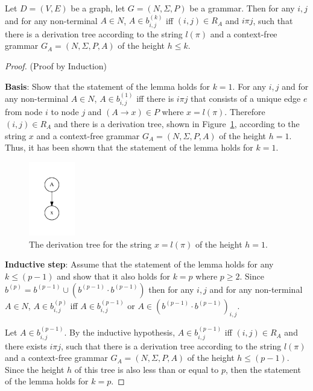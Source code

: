 \begin{lemma}
Let $D = (V,E)$ be a graph, let $G =(N,\Sigma,P)$ be a grammar. Then for any $i, j$ and for any non-terminal $A \in N$, $A \in b^{(k)}_{i,j}$ iff $(i,j) \in R_A$ and $i \pi j$, such that there is a derivation tree according to the string $l(\pi)$ and a context-free grammar $G_A = (N,\Sigma,P,A)$ of the height $h \leq k$.
\end{lemma}
\begin{proof}(Proof by Induction)

\textbf{Basis}: Show that the statement of the lemma holds for $k = 1$. For any $i, j$ and for any non-terminal $A \in N$, $A \in b^{(1)}_{i,j}$ iff there is $i \pi j$ that consists of a unique edge $e$ from node $i$ to node $j$ and $(A \rightarrow x) \in P$ where $x = l(\pi)$. Therefore $(i,j) \in R_A$ and there is a derivation tree, shown in Figure~\ref{tree1}, according to the string $x$ and a context-free grammar $G_A = (N,\Sigma,P,A)$ of the height $h = 1$. Thus, it has been shown that the statement of the lemma holds for $k = 1$.

\begin{figure}[h!]
 \centering
 \includegraphics[width=2cm]{pictures/tree1.pdf}
 \caption{The derivation tree for the string $x = l(\pi)$ of the height $h = 1$.}
 \label{tree1}
\end{figure}

\textbf{Inductive step}: Assume that the statement of the lemma holds for any $k \leq (p - 1)$ and show that it also holds for $k = p$ where $p \geq 2$. Since $b^{(p)} = b^{(p-1)} \cup (b^{(p-1)} \cdot b^{(p-1)})$ then for any $i, j$ and for any non-terminal $A \in N$, $A \in b^{(p)}_{i,j}$ iff $A \in b^{(p-1)}_{i,j}$ or $A \in (b^{(p-1)} \cdot b^{(p-1)})_{i,j}$.

Let $A \in b^{(p-1)}_{i,j}$. By the inductive hypothesis, $A \in b^{(p-1)}_{i,j}$ iff $(i,j) \in R_A$ and there exists $i \pi j$, such that there is a derivation tree according to the string $l(\pi)$ and a context-free grammar $G_A = (N,\Sigma,P,A)$ of the height $h \leq (p-1)$. Since the height $h$ of this tree is also less than or equal to $p$, then the statement of the lemma holds for $k = p$.


\end{proof}
